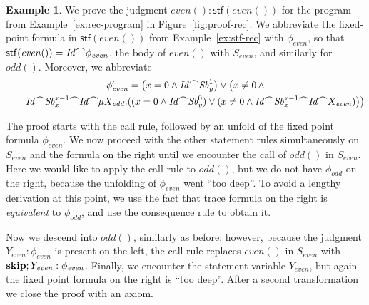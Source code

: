 \documentclass[10pt,a4paper]{amsart}
\theoremstyle{definition}
\newtheorem{example}[theorem]{Example}
\newcommand{\chop}[0]{\raisebox{1ex}{$\frown$}}
\newcommand{\stfs}[1]{\mathsf{stf} (#1)}
\newcommand{\Skip}{\mbox{\bf skip}}
\newcommand{\judge}[2]{#1 : #2}
\begin{document}
\begin{example}\label{ex:proof-rec}
  We prove the judgment
  $\judge{\mathit{even}()}{\stfs{\mathit{even}()}}$ for the program
  from Example~\ref{ex:rec-program} in Figure~\ref{fig:proof-rec}. We
  abbreviate the fixed-point formula in $\stfs{\mathit{even}()}$ from
  Example~\ref{ex:stf-rec} with $\phi_{\mathit{even}}$, so that
  $\stfs{\mathit{even}()}=\mathit{Id}\chop\phi_{\mathit{even}}$, the
  body of $\mathit{even}()$ with $S_{\mathit{even}}$, and similarly
  for $\mathit{odd}()$. Moreover, we abbreviate
  \begin{multline*}
    \phi'_{\mathit{even}}=\bigl(x = 0\land\mathit{Id}\chop \mathit{Sb}^{1}_{y}\bigr)\lor
    \bigl(x \neq 0\,\land\\
    \qquad\mathit{Id} \chop \mathit{Sb}^{x-1}_{x} \chop \mathit{Id}\chop\mu X_{\mathit{odd}}.((x = 0 \land \mathit{Id} \chop \mathit{Sb}^{0}_{y}) \lor(x \neq 0 \land 
    \mathit{Id} \chop \mathit{Sb}^{x-1}_{x}\chop \mathit{Id} \chop X_{\mathit{even}})\bigr)\bigr)
  \end{multline*}
  
  The proof starts with the call rule, followed by an unfold of the
  fixed point formula $\phi_{\mathit{even}}$. We now proceed with the
  other statement rules simultaneously on $S_{\mathit{even}}$ and the
  formula on the right until we encounter the call of $\mathit{odd}()$
  in $S_{\mathit{even}}$. Here we would like to apply the call rule to
  $\mathit{odd}()$, but we do not have $\phi_{\mathit{odd}}$ on the
  right, because the unfolding of $\phi_{\mathit{even}}$ went ``too
  deep''. To avoid a lengthy derivation at this point, we use the fact
  that trace formula on the right is \emph{equivalent} to
  $\phi_{\mathit{odd}}$, and use the consequence rule to obtain it.

  Now we descend into $\mathit{odd}()$, similarly as before; however,
  because the judgment
  $\judge{Y_{\mathit{even}}}{\phi_{\mathit{even}}}$ is present on the
  left, the call rule replaces $\mathit{even}()$ in
  $S_{\mathit{even}}$ with
  $\Skip;\judge{Y_{\mathit{even}}}{\phi_{\mathit{even}}}$. Finally, we
  encounter the statement variable $Y_{\mathit{even}}$, but again the
  fixed point formula on the right is ``too deep''. After a second
  transformation we close the proof with an axiom.
\end{example}
\end{document}
